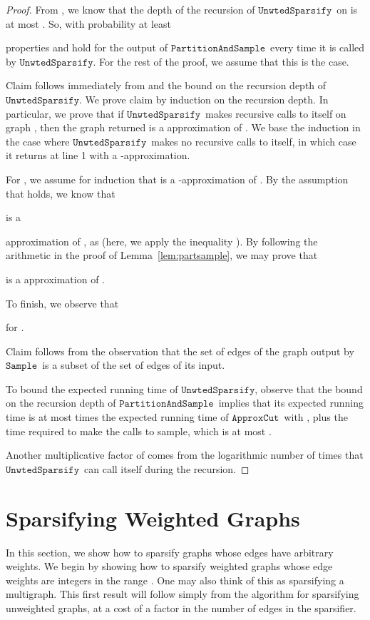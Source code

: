 \documentclass[11pt]{article}
\newcommand{\unwtedsparsify}{\ensuremath{\mathtt{UnwtedSparsify}}}
\newcommand{\sample}{\ensuremath{\mathtt{Sample}}}
\newcommand{\approxcut}{\ensuremath{\mathtt{ApproxCut}}}
\newcommand{\partsample}{\ensuremath{\mathtt{PartitionAndSample}}}
\begin{document}
\begin{proof}
From , we know that the depth of the recursion of
  \unwtedsparsify \ on  is at most .
So, with probability at least

properties  and  hold for the output of
  \partsample \ every time it is called by \unwtedsparsify.
For the rest of the proof, we assume that this is the case.

Claim  follows immediately from  and the bound on the
  recursion depth of \unwtedsparsify .
We prove claim  by induction on the recursion depth.
In particular, we prove that if \unwtedsparsify \ makes  recursive
  calls to itself on graph , then the graph  returned is
  a  approximation of .
We base the induction in the case where \unwtedsparsify \ makes no
  recursive calls to itself, in which case it returns at line 1
  with a -approximation.

For , we assume for induction that  is a
  -approximation of .
By the assumption that  holds, we know that
  
  is a

approximation of , as 
  (here, we apply the inequality ).
By following the arithmetic in the proof of Lemma~\ref{lem:partsample},
  we may prove that

  is a  approximation of .

To finish, we observe that

for .

Claim  follows from the observation that the set of edges of
  the graph output by \sample \ is a subset of the set of edges of its input.

To bound the expected running time of \unwtedsparsify,
  observe that the bound on the recursion depth of
  \partsample \ implies that its expected running time is at most
   times the expected running time
  of \approxcut \ with ,
  plus the time required to make the calls
  to sample, which is at most .

Another multiplicative factor of  comes from the
  logarithmic number of times that \unwtedsparsify \ can call
  itself during the recursion.
\end{proof}

\section{Sparsifying Weighted Graphs}\label{sec:weighted}
In this section, we show how to sparsify graphs whose edges have
  arbitrary weights.
We begin by showing how to sparsify weighted graphs
  whose edge weights are integers in the range
  .
One may also think of this as sparsifying a multigraph.
This first result will follow simply from the algorithm for
  sparsifying unweighted graphs, at a cost of a  factor
   in the number of edges in the sparsifier.
\end{document}
